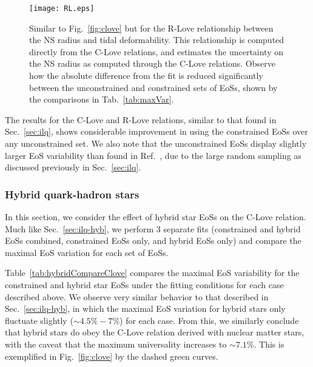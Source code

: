 \documentclass[prd,twocolumn,nofootinbib,superscriptaddress,amsmath,amssymb]{revtex4-1}
\begin{document}
\begin{figure}
\begin{center} 
\texttt{[image: RL.eps]}
\end{center}
\caption{
Similar to Fig.~\ref{fig:clove} but for the R-Love relationship between the NS radius and tidal deformability.
This relationship is computed directly from the C-Love relations, and estimates the uncertainty on the NS radius as computed through the C-Love relations.
Observe how the absolute difference from the fit is reduced significantly between the unconstrained and constrained sets of EoSs, shown by the comparisons in Tab.~\ref{tab:maxVar}.
}
\label{fig:rlove}
\end{figure} 

The results for the C-Love and R-Love relations, similar to that found in Sec.~\ref{sec:ilq}, shows considerable improvement in using the constrained EoSs over any unconstrained set.
We also note that the unconstrained EoSs display slightly larger EoS variability than found in Ref.~\cite{Yagi:binLove}, due to the large random sampling as discussed previously in Sec.~\ref{sec:ilq}.


\subsubsection{Hybrid quark-hadron stars}\label{sec:clove-hyb}
In this section, we consider the effect of hybrid star EoSs on the C-Love relation.
Much like Sec.~\ref{sec:ilq-hyb}, we perform 3 separate fits (constrained and hybrid EoSs combined, constrained EoSs only, and hybrid EoSs only) and compare the maximal EoS variation for each set of EoSs.

Table~\ref{tab:hybridCompareClove} compares the maximal EoS variability for the constrained and hybrid star EoSs under the fitting conditions for each case described above. 
We observe very similar behavior to that described in Sec.~\ref{sec:ilq-hyb}, in which the maximal EoS variation for hybrid stars only fluctuate slightly ($\sim 4.5\% - 7\%$) for each case.
From this, we similarly conclude that hybrid stars do obey the C-Love relation derived with nuclear matter stars, with the caveat that the maximum universality increases to $\sim 7.1\%$.
This is exemplified in Fig.~\ref{fig:clove} by the dashed green curves.
\end{document}

